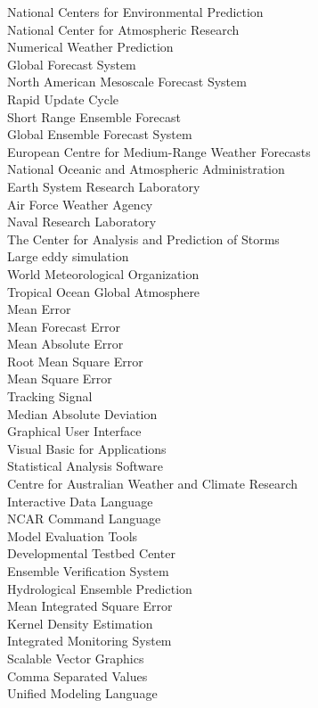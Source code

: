 \begin{figure}[!h]
\begin{minipage}[h]{0.8\textwidth}
		  National Centers for Environmental Prediction \\
		  National Center for Atmospheric Research \\
		  Numerical Weather Prediction \\
		  Global Forecast System \\
		  North American Mesoscale Forecast System \\
		  Rapid Update Cycle \\
		  Short Range Ensemble Forecast \\
		  Global Ensemble Forecast System \\
		  European Centre for Medium-Range Weather Forecasts \\
		  National Oceanic and Atmospheric Administration \\
		  Earth System Research Laboratory \\
		  Air Force Weather Agency \\
		  Naval Research Laboratory \\
		  The Center for Analysis and Prediction of Storms \\
		  Large eddy simulation \\
		  World Meteorological Organization \\
		  Tropical Ocean Global Atmosphere \\
		  Mean Error \\
		  Mean Forecast Error \\
		  Mean Absolute Error \\
		  Root Mean Square Error \\
		  Mean Square Error \\
		  Tracking Signal \\
		  Median Absolute Deviation \\
		  Graphical User Interface \\
		  Visual Basic for Applications \\
		  Statistical Analysis Software \\
		  Centre for Australian Weather and Climate Research \\
		  Interactive Data Language \\
		  NCAR Command Language \\
		  Model Evaluation Tools \\
		  Developmental Testbed Center \\
		  Ensemble Verification System \\
		  Hydrological Ensemble Prediction \\
		  Mean Integrated Square Error \\
		  Kernel Density Estimation \\
		  Integrated Monitoring System \\
		  Scalable Vector Graphics \\
		  Comma Separated Values \\
		  Unified Modeling Language 
		  \end{minipage}
	\end{figure}	  
			  